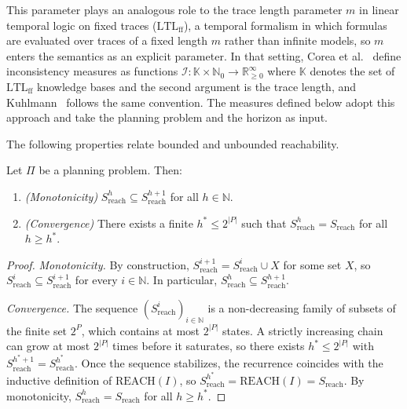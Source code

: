 This parameter plays an analogous role to the trace length parameter $m$ in linear temporal logic on fixed traces ($\text{LTL}_{\text{ff}}$), a temporal formalism in which formulas are evaluated over traces of a fixed length $m$ rather than infinite models, so $m$ enters the semantics as an explicit parameter. In that setting, Corea et al.~\cite{Corea2024} define inconsistency measures as functions $\mathcal{I} \colon \mathbb{K} \times \mathbb{N}_0 \to \mathbb{R}^{\infty}_{\geq 0}$ where $\mathbb{K}$ denotes the set of $\text{LTL}_{\text{ff}}$ knowledge bases and the second argument is the trace length, and Kuhlmann~\cite{Kuhlmann2025b} follows the same convention. The measures defined below adopt this approach and take the planning problem and the horizon as input.

The following properties relate bounded and unbounded reachability.

\begin{prop}
    \label{prop:horizon_convergence}
    Let $\Pi$ be a planning problem. Then:
    \begin{enumerate}
        \item \emph{(Monotonicity)} $S^h_{\text{reach}} \subseteq S^{h+1}_{\text{reach}}$ for all $h \in \mathbb{N}$.
        \item \emph{(Convergence)} There exists a finite $h^* \leq 2^{|P|}$ such that $S^h_{\text{reach}} = S_{\text{reach}}$ for all $h \geq h^*$.
    \end{enumerate}
\end{prop}

\begin{proof}
    \emph{Monotonicity.} By construction, $S^{i+1}_{\text{reach}} = S^i_{\text{reach}} \cup X$ for some set $X$, so $S^i_{\text{reach}} \subseteq S^{i+1}_{\text{reach}}$ for every $i \in \mathbb{N}$. In particular, $S^h_{\text{reach}} \subseteq S^{h+1}_{\text{reach}}$.

    \emph{Convergence.} The sequence $(S^i_{\text{reach}})_{i \in \mathbb{N}}$ is a non-decreasing family of subsets of the finite set $2^P$, which contains at most $2^{|P|}$ states. A strictly increasing chain can grow at most $2^{|P|}$ times before it saturates, so there exists $h^* \leq 2^{|P|}$ with $S^{h^*+1}_{\text{reach}} = S^{h^*}_{\text{reach}}$. Once the sequence stabilizes, the recurrence coincides with the inductive definition of $\text{REACH}(I)$, so $S^{h^*}_{\text{reach}} = \text{REACH}(I) = S_{\text{reach}}$. By monotonicity, $S^h_{\text{reach}} = S_{\text{reach}}$ for all $h \geq h^*$.
\end{proof}

